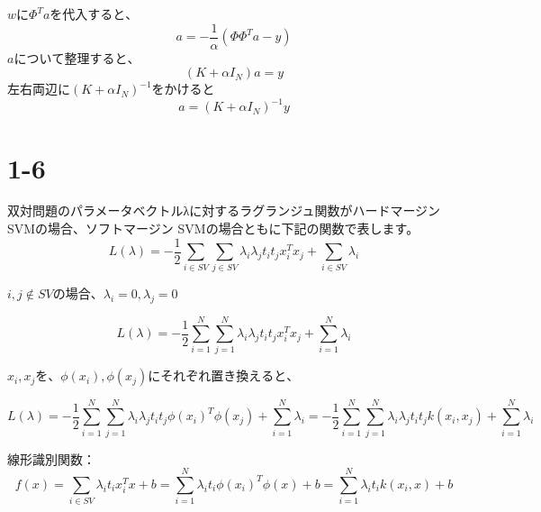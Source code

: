 \documentclass[a4paper,11pt]{jsarticle}
\begin{document}
$wに \Phi^T a を代入すると、$
\begin{equation*}
  a = - \frac{1}{\alpha} (\Phi \Phi^T a - y)
\end{equation*}
$aについて整理すると、$
\begin{equation*}
  (K + \alpha I_N) a = y
\end{equation*}
$左右両辺に(K + \alpha I_N)^{-1}をかけると$
\begin{equation*}
  a = (K + \alpha I_N)^{-1} y
\end{equation*}

\section*{1-6}

双対問題のパラメータベクトルλに対するラグランジュ関数がハードマージンSVMの場合、ソフトマージン SVMの場合ともに下記の関数で表します。
\begin{equation*}
  L(\lambda) = - \frac{1}{2} \sum_{i \in SV} \sum_{j \in SV} \lambda_i \lambda_j t_i t_j x_i^T x_j + \sum_{i \in SV} \lambda_i
\end{equation*}

$i, j \notin SVの場合、λ_i = 0, λ_j = 0 $

\begin{equation*}
  L(\lambda) = - \frac{1}{2} \sum_{i=1}^{N} \sum_{j=1}^{N} \lambda_i \lambda_j t_i t_j x_i^T x_j + \sum_{i=1}^{N} \lambda_i
\end{equation*}

$x_i, x_jを、\phi(x_i), \phi(x_j)にそれぞれ置き換えると、$

\begin{equation*}
  L(\lambda)
    = - \frac{1}{2} \sum_{i=1}^{N} \sum_{j=1}^{N} \lambda_i \lambda_j t_i t_j \phi(x_i)^T \phi(x_j) + \sum_{i=1}^{N} \lambda_i
    = - \frac{1}{2} \sum_{i=1}^{N} \sum_{j=1}^{N} \lambda_i \lambda_j t_i t_j k(x_i, x_j) + \sum_{i=1}^{N} \lambda_i
\end{equation*}

線形識別関数：
\begin{equation*}
  f(x)
    = \sum_{i \in SV} \lambda_i t_i x_i^T x + b
    = \sum_{i=1}^{N} \lambda_i t_i \phi(x_i)^T \phi(x) + b
    = \sum_{i=1}^{N} \lambda_i t_i k(x_i, x) + b
\end{equation*}
\end{document}
